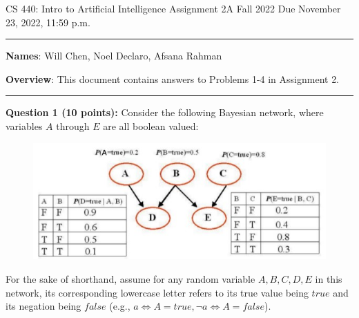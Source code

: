 \documentclass[12pt]{article}
\begin{document}
\noindent
CS 440: Intro to Artificial Intelligence \hfill Assignment 2A\newline
Fall 2022 \hfill Due November 23, 2022, 11:59 p.m.

\noindent
\rule{\linewidth}{0.4pt}

\vspace{.5cm}

\textbf{Names}: Will Chen, Noel Declaro, Afsana Rahman

\vspace{.5cm}

\textbf{Overview}:  This document contains answers to Problems 1-4 in Assignment 2. 

\noindent
\rule{\linewidth}{0.4pt}

\vspace{.5cm}

\textbf{Question 1 (10 points):} Consider the following Bayesian network, where variables $A$ through $E$ are all boolean valued:

\begin{figure}[h]
    \centering
    \includegraphics{images/probdescrips/prob1.jpg}
	\caption{}
	\label{fig:prob1}
\end{figure}

For the sake of shorthand, assume for any random variable $A,B,C,D,E$ in this network, its corresponding lowercase letter refers to its true value being $true$ and its negation being $false$ (e.g., $a \iff A = true, \neg a \iff A = false$).
\end{document}
